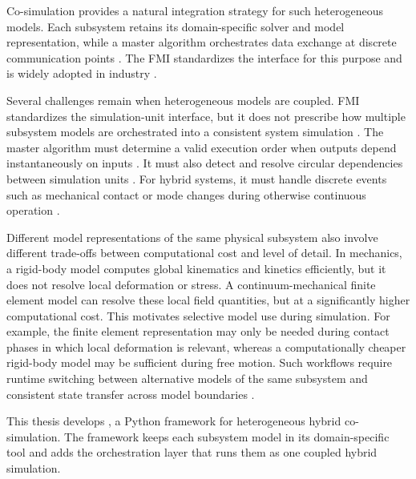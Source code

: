 Co-simulation provides a natural integration strategy for such heterogeneous models.
Each subsystem retains its domain-specific solver and model representation, while a master algorithm orchestrates data exchange at discrete communication points \cite{gomes_co-simulation_2019}.
The \ac{FMI} standardizes the interface for this purpose and is widely adopted in industry \cite{modelica_association_project_fmi_functional_2014}.

Several challenges remain when heterogeneous models are coupled.
\ac{FMI} standardizes the simulation-unit interface, but it does not prescribe how multiple subsystem models are orchestrated into a consistent system simulation \cite{gomes_co-simulation_2019}.
The master algorithm must determine a valid execution order when outputs depend instantaneously on inputs \cite{broman_requirements_2015}.
It must also detect and resolve circular dependencies between simulation units \cite{sicklinger_interface_2014}.
For hybrid systems, it must handle discrete events such as mechanical contact or mode changes during otherwise continuous operation \cite{broman_determinate_2013,StepRevision_Cremona,cremona_hybrid_2019}.

Different model representations of the same physical subsystem also involve different trade-offs between computational cost and level of detail.
In mechanics, a rigid-body model computes global kinematics and kinetics efficiently, but it does not resolve local deformation or stress.
A continuum-mechanical finite element model can resolve these local field quantities, but at a significantly higher computational cost.
This motivates selective model use during simulation.
For example, the finite element representation may only be needed during contact phases in which local deformation is relevant, whereas a computationally cheaper rigid-body model may be sufficient during free motion.
Such workflows require runtime switching between alternative models of the same subsystem and consistent state transfer across model boundaries \cite{Choi2014}.

This thesis develops \syssimx{}, a Python framework for heterogeneous hybrid co-simulation.
The framework keeps each subsystem model in its domain-specific tool and adds the orchestration layer that runs them as one coupled hybrid simulation.